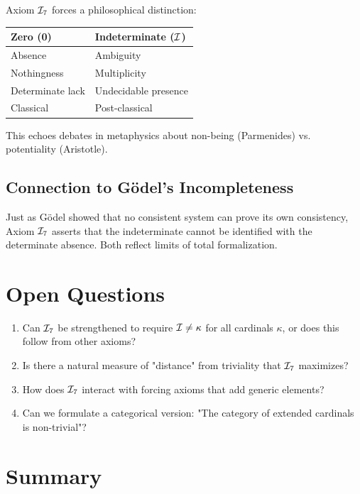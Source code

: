 Axiom $\mathcal{I}_7$ forces a philosophical distinction:

\begin{center}
\begin{tabular}{|l|l|}
\hline
\textbf{Zero (0)} & \textbf{Indeterminate ($\mathcal{I}$)} \\
\hline
Absence & Ambiguity \\
Nothingness & Multiplicity \\
Determinate lack & Undecidable presence \\
Classical & Post-classical \\
\hline
\end{tabular}
\end{center}

This echoes debates in metaphysics about non-being (Parmenides) vs. potentiality (Aristotle).

\subsection{Connection to Gödel's Incompleteness}

Just as Gödel showed that no consistent system can prove its own consistency, Axiom $\mathcal{I}_7$ asserts that the indeterminate cannot be identified with the determinate absence. Both reflect limits of total formalization.

\section{Open Questions}

\begin{enumerate}
    \item Can $\mathcal{I}_7$ be strengthened to require $\mathcal{I} \neq \kappa$ for all cardinals $\kappa$, or does this follow from other axioms?
    
    \item Is there a natural measure of "distance" from triviality that $\mathcal{I}_7$ maximizes?
    
    \item How does $\mathcal{I}_7$ interact with forcing axioms that add generic elements?
    
    \item Can we formulate a categorical version: "The category of extended cardinals is non-trivial"?
\end{enumerate}

\section{Summary}

